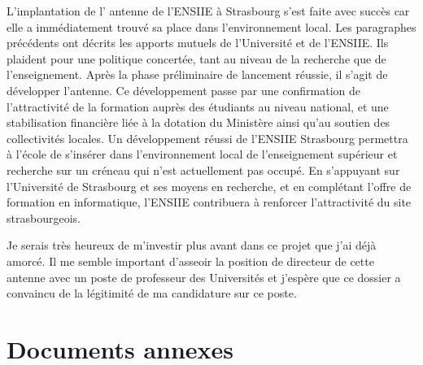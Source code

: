 \documentclass[11pt]{article}
\begin{document}
L'implantation de  l' antenne de l'ENSIIE  à Strasbourg s'est faite  avec succès
car  elle a  immédiatement trouvé  sa  place dans  l'environnement local.   Les
paragraphes précédents  ont décrits  les apports mutuels  de l'Université  et de
l'ENSIIE. Ils plaident pour une politique concertée, tant au niveau de
la recherche  que de  l'enseignement. Après la  phase préliminaire  de lancement
réussie,  il s'agit  de développer  l'antenne.  Ce  développement passe  par une
confirmation de  l'attractivité de la  formation auprès des étudiants  au niveau
national, et une stabilisation financière liée  à la dotation du Ministère ainsi
qu'au soutien  des collectivités  locales. Un  développement réussi  de l'ENSIIE
Strasbourg  permettra  à l'école  de  s'insérer  dans l'environnement  local  de
l'enseignement supérieur et recherche sur  un créneau qui n'est actuellement pas
occupé. En s'appuyant sur l'Université de Strasbourg et ses moyens en recherche,
et en  complétant l'offre de  formation en informatique, l'ENSIIE  contribuera à
renforcer l'attractivité du site strasbourgeois.

Je serais  très heureux de  m'investir plus avant dans  ce projet que  j'ai déjà
amorcé.  Il me  semble important  d'asseoir la  position de  directeur de  cette
antenne avec un poste de professeur des Universités et j'espère que ce dossier a
convaincu de la légitimité de ma candidature sur ce poste.




%




\newpage

\section{Documents annexes}
\end{document}
